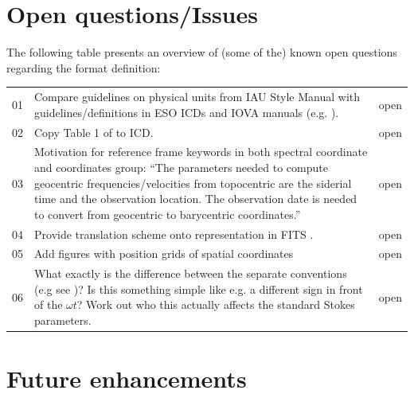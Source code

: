 \documentclass[a4paper,10pt,bibtotoc]{scrreprt}
\begin{document}
\section{Open questions/Issues}
\label{sec:open-questions}

The following table presents an overview of (some of the) known open
questions regarding the format definition:

\begin{center}
 \tablelasttail{\hline}
 \begin{supertabular}{lp{12.8cm}l}
   01 &  Compare guidelines on physical units from IAU Style Manual
   \cite{mcnally.1988} with guidelines/definitions in ESO ICDs and IOVA manuals
   (e.g. \cite{ivoa.stc}). & open \\
   02 & Copy Table 1 of \cite{fits.paper3} to ICD. & open \\
   03 & Motivation for reference frame keywords in both spectral coordinate and
   coordinates group: ``The parameters needed to compute geocentric
   frequencies/velocities from topocentric are the siderial time and the observation
   location. The observation date is needed to convert from geocentric to barycentric
   coordinates.'' \cite{fits.paper3} & open \\
   04 & Provide translation scheme onto representation in FITS \cite{fits.paper1,fits.paper2,fits.paper3}. & open \\
   05 & Add figures with position grids of spatial coordinates & open
   \\
   06 & What exactly is the difference between the separate conventions (e.g
   see \cite{straten.2009})? Is this something simple like e.g. a
   different sign in front of the $\omega t$? Work out who this
   actually affects the standard Stokes parameters. & open \\
 \end{supertabular}
\end{center}

\section{Future enhancements}
\label{sec:future-enhancements}
\end{document}
